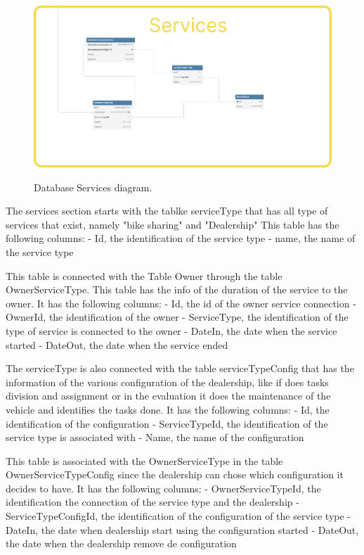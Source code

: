 \begin{figure}[h]
  \caption{Database Services diagram.}
  \centering
  \includegraphics[width=\textwidth]{figs/dbDiagrams/Services}
  \label{fig:figure2}
\end{figure}

The services section starts with the tablke serviceType that has all type of services that exist, namely "bike sharing" and "Dealership"
This table has the following columns:
- Id, the identification of the service type
- name, the name of the service type

This table is connected with the Table Owner through the table OwnerServiceType.
This table has the info of the duration of the service to the owner.
It has the following columns:
- Id, the id of the owner service connection
- OwnerId, the identification of the owner
- ServiceType, the identification of the type of service is connected to the owner
- DateIn, the date when the service started
- DateOut, the date when the service ended

The serviceType is also connected with the table serviceTypeConfig that has the information of the various configuration of the dealership, like if does tasks division and assignment or in the evaluation it does the maintenance of the vehicle and identifies the tasks done.
It has the following columns:
- Id, the identification of the configuration
- ServiceTypeId, the identification of the service type is associated with
- Name, the name of the configuration

This table is associated with the OwnerServiceType in the table OwnerServiceTypeConfig since the dealership can chose which configuration it decides to have.
It has the following columns:
- OwnerServiceTypeId, the identification the connection of the service type and the dealership
- ServiceTypeConfigId, the identification of the configuration of the service type
- DateIn, the date when dealership start using the configuration started
- DateOut, the date when the dealership remove de configuration


